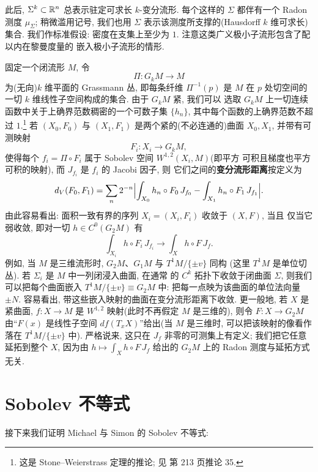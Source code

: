 此后, $\Sigma^k\subset\mathbb{R}^n$ 总表示驻定可求长 $k$-变分流形. 每个这样的
$\Sigma$ 都伴有一个 Radon 测度 $\mu_\Sigma$; 稍微滥用记号, 我们也用
$\Sigma$ 表示该测度所支撑的(Hausdorff $k$ 维可求长)集合. 我们作标准假设:
密度在支集上至少为 $1$. 注意这类广义极小子流形包含了配以内在黎曼度量的
嵌入极小子流形的情形.

固定一个闭流形 $M$, 令
\[
\Pi:G_kM\to M
\]
为(无向)$k$ 维平面的 Grassmann 丛, 即每条纤维 $\Pi^{-1}(p)$ 是 $M$ 在
$p$ 处切空间的一切 $k$ 维线性子空间构成的集合. 由于 $G_kM$ 紧, 我们可以
选取 $G_kM$ 上一切连续函数中关于上确界范数稠密的一个可数子集 $\{h_n\}$,
其中每个函数的上确界范数不超过 $1$.\footnote{这是 Stone--Weierstrass
定理的推论; 见 \cite{R} 第 213 页推论 35.}
若 $(X_0,F_0)$ 与 $(X_1,F_1)$ 是两个紧的(不必连通的)曲面 $X_0,X_1$,
并带有可测映射
\[
F_i:X_i\to G_kM,
\]
使得每个 $f_i=\Pi\circ F_i$ 属于 Sobolev 空间 $W^{1,2}(X_i,M)$(即平方
可积且梯度也平方可积的映射), 而 $J_{f_i}$ 是 $f_i$ 的 Jacobi 因子, 则
它们之间的\textbf{变分流形距离}按定义为
\begin{equation}
d_V(F_0,F_1)=\sum_n2^{-n}
 \Bigl|\int_{X_0}h_n\circ F_0\,J_{f_0}
 -\int_{X_1}h_n\circ F_1\,J_{f_1}\Bigr|.
\label{eq:3.36}
\end{equation}
由此容易看出: 面积一致有界的序列 $X_i=(X_i,F_i)$ 收敛于 $(X,F)$, 当且
仅当它弱收敛, 即对一切 $h\in C^0(G_2M)$ 有
\begin{equation}
\int_{X_i}h\circ F_i\,J_{f_i}\to\int_X h\circ F\,J_f.
\label{eq:3.37}
\end{equation}
例如, 当 $M$ 是三维流形时, $G_2M$、$G_1M$ 与 $T^1M/\{\pm v\}$ 同构
(这里 $T^1M$ 是单位切丛). 若 $\Sigma_i$ 是 $M$ 中一列闭浸入曲面, 在通常
的 $C^k$ 拓扑下收敛于闭曲面 $\Sigma$, 则我们可以把每个曲面嵌入
$T^1M/\{\pm v\}\equiv G_2M$ 中: 把每一点映为该曲面的单位法向量 $\pm N$.
容易看出, 带这些嵌入映射的曲面在变分流形距离下收敛. 更一般地, 若 $X$ 是
紧曲面, $f:X\to M$ 是 $W^{1,2}$ 映射(此时不再假定 $M$ 是三维的), 则令
$F:X\to G_2M$ 由``$F(x)$ 是线性子空间 $df(T_xX)$''给出(当 $M$ 是三维时,
可以把该映射的像看作落在 $T^1M/\{\pm v\}$ 中). 严格说来, 这只在 $J_f$
非零的可测集上有定义; 我们把它任意延拓到整个 $X$, 因为由
$h\mapsto\int_X h\circ F\,J_f$ 给出的 $G_2M$ 上的 Radon 测度与延拓方式
无关.

\section{Sobolev 不等式}
\label{sec:3.2}

接下来我们证明 Michael 与 Simon \cite{MiSi} 的 Sobolev 不等式:

